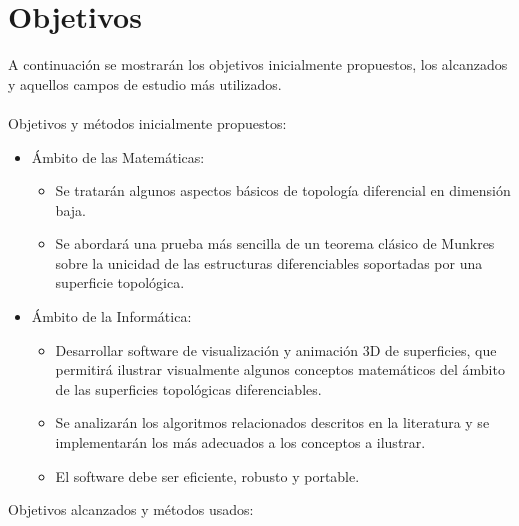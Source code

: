 %


\chapter{Objetivos}

A continuación se mostrarán los objetivos inicialmente propuestos, los alcanzados y aquellos campos de estudio más utilizados.\\
\\Objetivos y métodos inicialmente propuestos:
\begin{itemize}
	\item Ámbito de las Matemáticas:
	\begin{itemize}
		\item Se tratarán algunos aspectos básicos de topología diferencial en dimensión baja.
		\item Se abordará una prueba más sencilla de un teorema clásico de Munkres sobre la unicidad de las estructuras diferenciables soportadas por una superficie topológica.
	\end{itemize}
	\item Ámbito de la Informática:
	\begin{itemize}
		\item Desarrollar software de visualización y animación $3$D de superficies, que permitirá ilustrar visualmente algunos conceptos matemáticos del ámbito de las superficies topológicas diferenciables.
		\item Se analizarán los algoritmos relacionados descritos en la literatura y se implementarán los más adecuados a los conceptos a ilustrar.
		\item El software debe ser eficiente, robusto y portable.
	\end{itemize}
\end{itemize}
Objetivos alcanzados y métodos usados:
